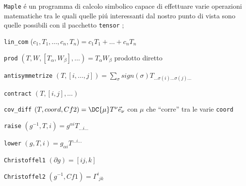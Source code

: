\def\Comandi#1{ %
{\tt #1}
}

\Comandi{Maple} \'e un programma di calcolo simbolico capace di effettuare varie operazioni matematiche tra le quali quelle pi\'u interessanti dal nostro punto di vista sono quelle possibili con il pacchetto \Comandi{tensor}; 
\vskip 3cm
\par
\Comandi{lin\_com}($c_1,T_1,\dots,c_n,T_n$)$=c_1T_1+\dots+c_nT_n$\par
\Comandi{prod}$(T,W,[T_\alpha,W_\beta],\dots)=T_\alpha W_\beta$ prodotto diretto \par
\Comandi{antisymmetrize}$(T,[i,\dots,j])=\sum_{\sigma} sign(\sigma) T_{\dots\sigma(i)\dots\sigma(j)\dots}$\par
\Comandi{contract}$(T,[i,j],\dots)$\par
\Comandi{cov\_diff}$(T,coord,Cf2)=\DC{\mu}T^\nu\Vec{e}_\nu$ con $\mu$ che ``corre'' tra le varie {\tt coord }\par
\Comandi{raise}$(g^{-1},T,i)=g^{\alpha i}T_{\dots i\dots}$\par
\Comandi{lower}$(g,T,i)=g_{\alpha i}T^{\dots i\dots}$\par
\Comandi{Christoffel1}$(\partial g)=[ij,k]$\par
\Comandi{Christoffel2}$(g^{-1},Cf1)=\Gamma^{i}_{\phantom{i}jk}$\par
